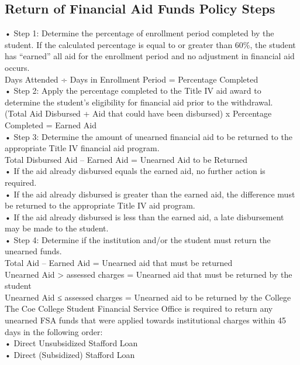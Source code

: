\documentclass[
  letterpaper,
]{scrbook}
\begin{document}
\subsection{Return of Financial Aid Funds Policy
Steps}\label{return-of-financial-aid-funds-policy-steps}

• Step 1: Determine the percentage of enrollment period completed by the
student. If the calculated percentage is equal to or greater than 60\%,
the student has ``earned'' all aid for the enrollment period and no
adjustment in financial aid occurs.\\
Days Attended ÷ Days in Enrollment Period = Percentage Completed\\
• Step 2: Apply the percentage completed to the Title IV aid award to
determine the student's eligibility for financial aid prior to the
withdrawal.\\
(Total Aid Disbursed + Aid that could have been disbursed) x Percentage
Completed = Earned Aid\\
• Step 3: Determine the amount of unearned financial aid to be returned
to the appropriate Title IV financial aid program.\\
Total Disbursed Aid -- Earned Aid = Unearned Aid to be Returned\\
• If the aid already disbursed equals the earned aid, no further action
is required.\\
• If the aid already disbursed is greater than the earned aid, the
difference must be returned to the appropriate Title IV aid program.\\
• If the aid already disbursed is less than the earned aid, a late
disbursement may be made to the student.\\
• Step 4: Determine if the institution and/or the student must return
the unearned funds.\\
Total Aid -- Earned Aid = Unearned aid that must be returned\\
Unearned Aid \textgreater{} assessed charges = Unearned aid that must be
returned by the student\\
Unearned Aid ≤ assessed charges = Unearned aid to be returned by the
College\\
The Coe College Student Financial Service Office is required to return
any unearned FSA funds that were applied towards institutional charges
within 45 days in the following order:\\
• Direct Unsubsidized Stafford Loan\\
• Direct (Subsidized) Stafford Loan\\
\end{document}
